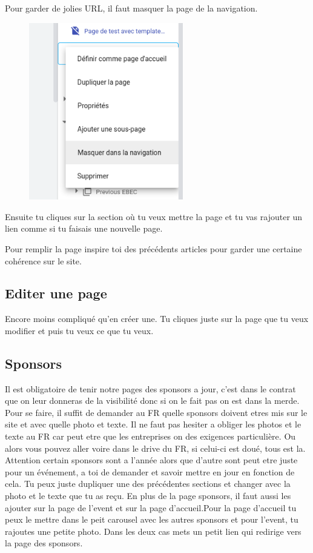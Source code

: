\documentclass[12pt]{article}
\begin{document}
		Pour garder de jolies URL, il faut masquer la page de la navigation.
		\begin{figure}[htp]
			\centering
			\includegraphics[width=0.6\textwidth]{img/Mask.png}
		\end{figure}

		Ensuite tu cliques sur la section où tu veux mettre la page et tu vas rajouter un lien comme si tu faisais une nouvelle page.

		Pour remplir la page inspire toi des précédents articles pour garder une certaine cohérence sur le site.
		
	\subsection{Editer une page}
		Encore moins compliqué qu'en créer une. Tu cliques juste sur la page que tu veux modifier et puis tu veux ce que tu veux.
		
	\subsection{Sponsors}
			
	Il est obligatoire de tenir notre pages des sponsors a jour, c'est dans le contrat que on leur donneras de la visibilité donc si on le fait pas on est dans la merde.
	Pour se faire, il suffit de demander au FR quelle sponsors doivent etres mis sur le site et avec quelle photo et texte. Il ne faut pas hesiter a obliger les photos et le texte au FR car peut etre que les entreprises on des exigences particulière. Ou alors vous pouvez aller voire dans le drive du FR, si celui-ci est doué, tous est la.
	Attention certain sponsors sont a l'année alors que d'autre sont peut etre juste pour un événement, a toi de demander et savoir mettre en jour en fonction de cela. 
	Tu peux juste dupliquer une des précédentes sections et changer avec la photo et le texte que tu as reçu.	
	En plus de la page sponsors, il faut aussi les ajouter sur la page  de l'event et sur la page d'accueil.Pour la page d'accueil tu peux le mettre dans le peit carousel avec les autres sponsors et pour l'event, tu rajoutes une petite photo. Dans les deux cas mets un petit lien qui redirige vers la page des sponsors.
	
\end{document}
